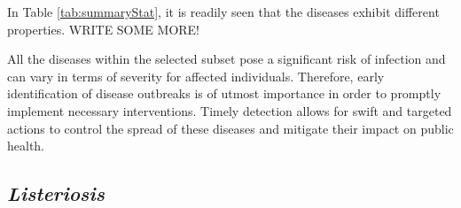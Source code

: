 \documentclass[a4paper,twoside,11pt]{report} %
\theoremstyle{definition}
\theoremstyle{definition}
\theoremstyle{definition}
\theoremstyle{definition}
\theoremstyle{remark}
\begin{document}
\begin{table}[H]

\caption{\label{tab:summaryStat}Summary statistics of the monthly count observations for the subset of diseases considered in this master's thesis. Boxplot: median (red line), IQR (grey box), whiskers (1.5 IQR), outliers (points).  Time series: normalized observations (0-1), first time points minimum and maximum count (red)}
\centering
{}
\end{table}

In Table \ref{tab:summaryStat}, it is readily seen that the diseases exhibit different properties. WRITE SOME MORE!

All the diseases within the selected subset pose a significant risk of infection and can vary in terms of severity for affected individuals. Therefore, early identification of disease outbreaks is of utmost importance in order to promptly implement necessary interventions. Timely detection allows for swift and targeted actions to control the spread of these diseases and mitigate their impact on public health.

\subsection{\textit{Listeriosis}}
\end{document}
